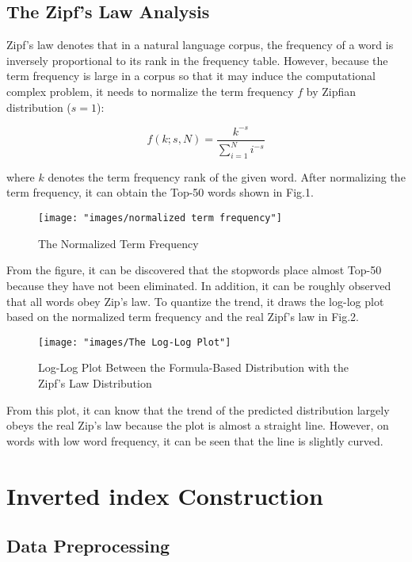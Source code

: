 \documentclass[11pt]{article}
\begin{document}
\subsection{The Zipf's Law Analysis}

Zipf's law denotes that in a natural language corpus, the frequency of a word is inversely proportional to its rank in the frequency table\cite{linders2022zipf}. However, because the term frequency is large in a corpus so that it may induce the computational complex problem, it needs to normalize the term frequency $f$ by Zipfian distribution ($s=1$)\cite{lavi2022learnability}:

\begin{equation}
f(k;s,N) = \frac{k^{-s}}{\sum_{i=1}^{N} i^{-s}}
\end{equation}

where $k$ denotes the term frequency rank of the given word. After normalizing the term frequency, it can obtain the Top-50 words shown in Fig.1.

\begin{figure}[h]
	\centering
	\texttt{[image: "images/normalized term frequency"]}
	\caption{The Normalized Term Frequency}
	\label{fig:normalized-term-frequency}
\end{figure}

From the figure, it can be discovered that the stopwords place almost Top-50 because they have not been eliminated. In addition, it can be roughly observed that all words obey Zip's law. To quantize the trend, it draws the log-log plot based on the normalized term frequency and the real Zipf's law in Fig.2.

\begin{figure}[h]
	\centering
	\texttt{[image: "images/The Log-Log Plot"]}
	\caption{Log-Log Plot Between the Formula-Based Distribution with the Zipf's Law Distribution}
	\label{fig:the-log-log-plot}
\end{figure}

From this plot, it can know that the trend of the predicted distribution largely obeys the real Zip's law because the plot is almost a straight line. However, on words with low word frequency, it can be seen that the line is slightly curved.

\section{Inverted index Construction}

\subsection{Data Preprocessing}
\end{document}
